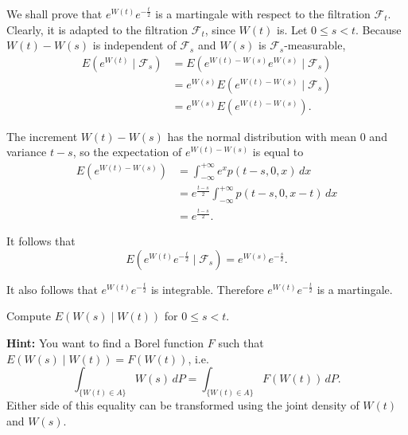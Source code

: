 \begin{Solution}
We shall prove that $e^{W(t)} e^{-\frac{t}{2}}$ is a martingale with respect to the filtration $\mathcal{F}_t$. Clearly, it is adapted to the filtration $\mathcal{F}_t$, since $W(t)$ is. Let $0 \leq s < t$. Because $W(t) - W(s)$ is independent of $\mathcal{F}_s$ and $W(s)$ is $\mathcal{F}_s$-measurable,
\begin{equation}
\begin{aligned}
E\left(e^{W(t)} \mid \mathcal{F}_s\right) &= E\left(e^{W(t) - W(s)} e^{W(s)} \mid \mathcal{F}_s\right) \\
&= e^{W(s)} E\left(e^{W(t) - W(s)} \mid \mathcal{F}_s\right) \\
&= e^{W(s)} E\left(e^{W(t) - W(s)}\right).
\end{aligned}
\end{equation}

The increment $W(t) - W(s)$ has the normal distribution with mean 0 and variance $t - s$, so the expectation of $e^{W(t) - W(s)}$ is equal to
\begin{equation}
\begin{aligned}
E\left(e^{W(t) - W(s)}\right) &= \int_{-\infty}^{+\infty} e^x p(t - s, 0, x) \, dx \\
&= e^{\frac{t-s}{2}} \int_{-\infty}^{+\infty} p(t - s, 0, x - t) \, dx \\
&= e^{\frac{t-s}{2}}.
\end{aligned}
\end{equation}

It follows that
\[
E\left(e^{W(t)} e^{-\frac{t}{2}} \mid \mathcal{F}_s\right) = e^{W(s)} e^{-\frac{s}{2}}.
\]

It also follows that $e^{W(t)} e^{-\frac{t}{2}}$ is integrable. Therefore $e^{W(t)} e^{-\frac{t}{2}}$ is a martingale.
\end{Solution}

\begin{Exercise}
\label{ex:wiener-conditional-expectation}
Compute $E(W(s) \mid W(t))$ for $0 \leq s < t$.

\noindent\textbf{Hint:} You want to find a Borel function $F$ such that $E(W(s) \mid W(t)) = F(W(t))$, i.e.
\[
\int_{\{W(t) \in A\}} W(s) \, dP = \int_{\{W(t) \in A\}} F(W(t)) \, dP.
\]
Either side of this equality can be transformed using the joint density of $W(t)$ and $W(s)$.
\end{Exercise}

